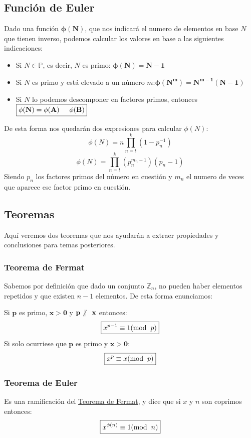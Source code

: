 \subsection{Función de Euler}
 Dado una función \(\mathbf{\phi (N)}\), que nos indicará el numero de elementos en base \(N\) que tienen inverso, podemos calcular los valores en base a las siguientes indicaciones:
\begin{itemize}
        \item Si \(N \in \mathbb{P}\), es decir, \(N\) es primo: \(\boxed{\mathbf{\phi (N) = N - 1}}\)
        \item Si \(N\) es primo y está elevado a un número \(m\):\(\boxed{\mathbf{\phi (N^m) = N^{m-1}(N-1)}}\)
        \item Si \(N\) lo podemos descomponer en factores primos, entonces \(\boxed{\mathbf{\phi (N) = \phi(A)\hspace{5mm} \phi(B)}}\)
\end{itemize}
 De esta forma nos quedarán dos expresiones para calcular \(\phi(N)\):
\[
        \phi(N) = n \prod^k_{n=t}(1-p_n^{-1})
\]
\[
        \boxed{\phi(N)   = \prod^k_{n=t}(p_n^{m_n-1})(p_n-1)}
\]
 Siendo \(p_n\) los factores primos del número en cuestión y \(m_n\) el numero de veces que aparece ese factor primo en cuestión.
\subsection{Teoremas}
 Aquí veremos dos teoremas que nos ayudarán a extraer propiedades y conclusiones para temas posteriores.
\subsubsection{Teorema de Fermat}
 Sabemos por definición que dado un conjunto \(\mathbb{Z}_n\), no pueden haber elementos repetidos y que existen \(n-1\) elementos. De esta forma enunciamos:
\par  Si \(\mathbf{p}\) es primo, \(\mathbf{x>0}\) y \(\mathbf{p\not |\hspace{3mm}x }\) entonces:
\[
        \boxed{x^{p-1} \equiv 1(\textnormal{mod}\hspace{2mm}p)}
\]
 Si solo ocurriese que \(\mathbf{p}\) es primo y \(\mathbf{x>0}\):
\[
        \boxed{x^{p} \equiv x(\textnormal{mod}\hspace{2mm}p)}
\]
\subsubsection{Teorema de Euler}
 Es una ramificación del \underline{Teorema de Fermat}, y dice que si \(x\) y \(n\) son coprimos entonces:
\[
        \boxed{x^{\phi(n)} \equiv 1(\textnormal{mod}\hspace{2mm}n)}
\]
